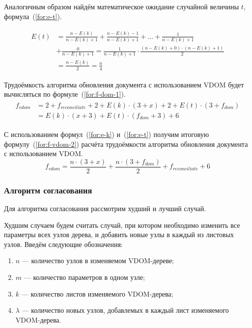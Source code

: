 Аналогичным образом найдём математическое ожидание случайной величины $t$, формула~(\ref{for:e-t}).

\begin{align}
	\begin{split}
		\label{for:e-t}
		E(t) &= \frac{n - E(k)}{n - E(k) + 1} + \frac{n - E(k) - 1}{n - E(k) + 1} + \dotsc +  \frac{1}{n - E(k) + 1} \\
		&+\frac{0}{n - E(k) + 1} = \frac{1}{n - E(k) + 1} \cdot \frac{(n - E(k) + 0)\cdot(n - E(k) + 1)}{2}\\
		&= \frac{n - E(k)}{2} = \frac{n}{4}
	\end{split}
\end{align}

Трудоёмкость алгоритма обновления документа с использованием VDOM будет вычисляться по формуле~(\ref{for:f-dom-1}).
\begin{align}
	\begin{split}
	\label{for:f-vdom-1}
	f_{vdom} &= 2 + f_{reconciliate} + 2 + E(k)\cdot(3 + x) + 2 + E(t)\cdot(3 + f_{dom}) \\
	&= E(k) \cdot (x + 3) + E(t) \cdot (f_{dom} + 3) + 6
	\end{split}
\end{align}

С использованием формул~(\ref{for:e-k}) и~(\ref{for:e-t}) получим итоговую формулу~(\ref{for:f-vdom-2}) расчёта трудоёмкости алгоритма обновления документа с использованием VDOM.
\begin{equation}
	\label{for:f-vdom-2}
	f_{vdom} = \frac{n \cdot (3 + x)}{2} + \frac{n\cdot(3 + f_{dom})}{2} + f_{reconciliate} + 6
\end{equation}


\subsubsection{Алгоритм согласования}

Для алгоритма согласования рассмотрим худший и лучший случай.

Худшим случаем будем считать случай, при котором необходимо изменить все параметры всех узлов дерева, и добавить новые узлы в каждый из листовых узлов.
Введём следующие обозначения:
\begin{enumerate}[label=\arabic*)]
	\item $n$ --- количество узлов в изменяемом VDOM-дереве;
	\item $m$ --- количество параметров в одном узле;
	\item $k$ --- количество листов изменяемого VDOM-дерева;
	\item $\lambda$ --- количество новых узлов, добавлемых в каждый лист изменяемого VDOM-дерева.
\end{enumerate}

